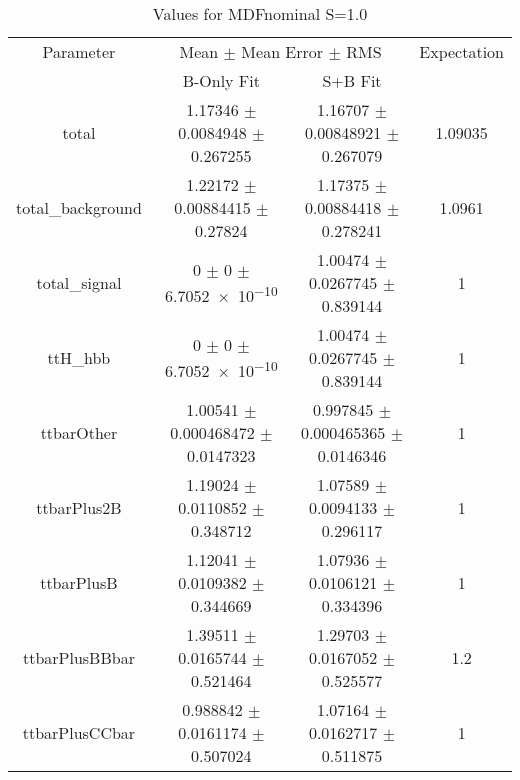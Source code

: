 \begin{table}
\centering
\caption{Values for MDFnominal S=1.0}
\begin{tabular}{cccc}
\toprule
Parameter & \multicolumn{2}{c}{Mean $\pm$ Mean Error $\pm$ RMS} & Expectation\\
 & B-Only Fit & S+B Fit & \\
\midrule
total & \num{1.17346} $\pm$ \num{0.0084948} $\pm$ \num{0.267255} & \num{1.16707} $\pm$ \num{0.00848921} $\pm$ \num{0.267079} & \num{1.09035}\\
total\_background & \num{1.22172} $\pm$ \num{0.00884415} $\pm$ \num{0.27824} & \num{1.17375} $\pm$ \num{0.00884418} $\pm$ \num{0.278241} & \num{1.0961}\\
total\_signal & \num{0} $\pm$ \num{0} $\pm$ \num{6.7052e-10} & \num{1.00474} $\pm$ \num{0.0267745} $\pm$ \num{0.839144} & \num{1}\\
ttH\_hbb & \num{0} $\pm$ \num{0} $\pm$ \num{6.7052e-10} & \num{1.00474} $\pm$ \num{0.0267745} $\pm$ \num{0.839144} & \num{1}\\
ttbarOther & \num{1.00541} $\pm$ \num{0.000468472} $\pm$ \num{0.0147323} & \num{0.997845} $\pm$ \num{0.000465365} $\pm$ \num{0.0146346} & \num{1}\\
ttbarPlus2B & \num{1.19024} $\pm$ \num{0.0110852} $\pm$ \num{0.348712} & \num{1.07589} $\pm$ \num{0.0094133} $\pm$ \num{0.296117} & \num{1}\\
ttbarPlusB & \num{1.12041} $\pm$ \num{0.0109382} $\pm$ \num{0.344669} & \num{1.07936} $\pm$ \num{0.0106121} $\pm$ \num{0.334396} & \num{1}\\
ttbarPlusBBbar & \num{1.39511} $\pm$ \num{0.0165744} $\pm$ \num{0.521464} & \num{1.29703} $\pm$ \num{0.0167052} $\pm$ \num{0.525577} & \num{1.2}\\
ttbarPlusCCbar & \num{0.988842} $\pm$ \num{0.0161174} $\pm$ \num{0.507024} & \num{1.07164} $\pm$ \num{0.0162717} $\pm$ \num{0.511875} & \num{1}\\
\bottomrule
\end{tabular}
\end{table}